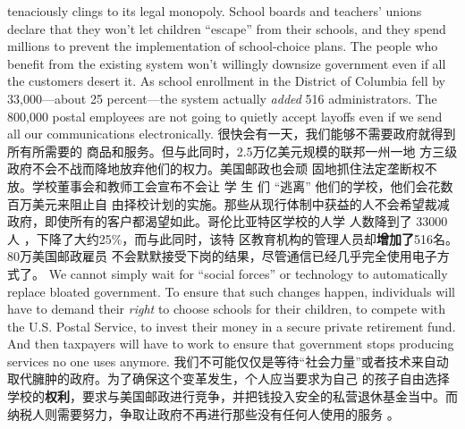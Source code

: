 \begin{paracol}{2}
tenaciously clings to its legal monopoly. School boards and
teachers' unions declare that they won't let children ``escape''
from their schools, and they spend millions to prevent the implementation of school-choice plans. The people who benefit
from the existing system won't willingly downsize government
even if all the customers desert it. As school enrollment in the
District of Columbia fell by 33,000---about 25 percent---the
system actually \textit{added} 516 administrators. The 800,000 postal
employees are not going to quietly accept layoffs even if we
send all our communications electronically.
\switchcolumn
很快会有一天，我们能够不需要政府就得到所有所需要的
商品和服务。但与此同时，2.5万亿美元规模的联邦一州一地
方三级政府不会不战而降地放弃他们的权力。美国邮政也会顽
固地抓住法定垄断权不放。学校董事会和教师工会宣布不会让
学 生 们 “逃离” 他们的学校，他们会花数百万美元来阻止自
由择校计划的实施。那些从现行体制中获益的人不会希望裁减
政府，即使所有的客户都渴望如此。哥伦比亚特区学校的人学
人数降到了 33000人 ，下降了大约25\%，而与此同时，该特
区教育机构的管理人员却\textbf{增加了}516名。80万美国邮政雇员
不会默默接受下岗的结果，尽管通信已经几乎完全使用电子方
式了。
\switchcolumn*
We cannot simply wait for ``social forces'' or technology to
automatically replace bloated government. To ensure that such
changes happen, individuals will have to demand their \textit{right} to
choose schools for their children, to compete with the U.S.
Postal Service, to invest their money in a secure private retirement fund. And then taxpayers will have to work to ensure
that government stops producing services no one uses anymore.
\switchcolumn
我们不可能仅仅是等待“社会力量”或者技术来自动取代臃肿的政府。为了确保这个变革发生，个人应当要求为自己
的孩子自由选择学校的\textbf{权利}，要求与美国邮政进行竞争，并把钱投入安全的私营退休基金当中。而纳税人则需要努力，争取让政府不再进行那些没有任何人使用的服务 。

\end{paracol}